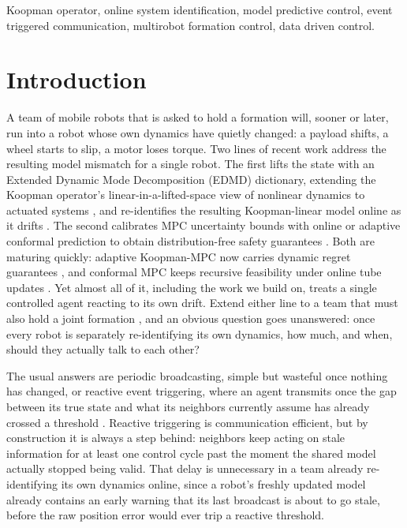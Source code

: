\documentclass[10pt,conference]{IEEEtran}
\begin{document}
\begin{IEEEkeywords}
Koopman operator, online system identification, model predictive control, event triggered communication, multirobot formation control, data driven control.
\end{IEEEkeywords}

\section{Introduction}

A team of mobile robots that is asked to hold a formation will, sooner or later, run into a robot whose own dynamics have quietly changed: a payload shifts, a wheel starts to slip, a motor loses torque. Two lines of recent work address the resulting model mismatch for a single robot. The first lifts the state with an Extended Dynamic Mode Decomposition (EDMD) dictionary, extending the Koopman operator's linear-in-a-lifted-space view of nonlinear dynamics \cite{williams2015,mezic2005} to actuated systems \cite{korda2018,proctor2016}, and re-identifies the resulting Koopman-linear model online as it drifts \cite{uchida2024,delrio2025,zhoutzoumas2025,yang2025}. The second calibrates MPC uncertainty bounds with online or adaptive conformal prediction to obtain distribution-free safety guarantees \cite{stamouli2024,lindemann2023,nakamura2022,zhouzhangluo2024,chee2024,hsu2025}. Both are maturing quickly: adaptive Koopman-MPC now carries dynamic regret guarantees \cite{zhoutzoumas2025}, and conformal MPC keeps recursive feasibility under online tube updates \cite{stamouli2024}. Yet almost all of it, including the work we build on, treats a single controlled agent reacting to its own drift. Extend either line to a team that must also hold a joint formation \cite{oh2015}, and an obvious question goes unanswered: once every robot is separately re-identifying its own dynamics, how much, and when, should they actually talk to each other?

The usual answers are periodic broadcasting, simple but wasteful once nothing has changed, or reactive event triggering, where an agent transmits once the gap between its true state and what its neighbors currently assume has already crossed a threshold \cite{tabuada2007,heemels2012,anta2010,trimpe2014}. Reactive triggering is communication efficient, but by construction it is always a step behind: neighbors keep acting on stale information for at least one control cycle past the moment the shared model actually stopped being valid. That delay is unnecessary in a team already re-identifying its own dynamics online, since a robot's freshly updated model already contains an early warning that its last broadcast is about to go stale, before the raw position error would ever trip a reactive threshold.
\end{document}
